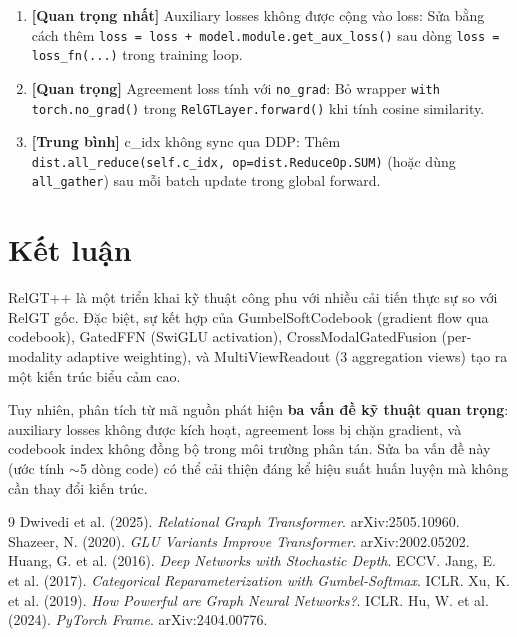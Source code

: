 \documentclass[12pt,a4paper]{article}
\begin{document}
\begin{enumerate}
  \item \textbf{[Quan trọng nhất]} Auxiliary losses không được cộng vào loss:
        Sửa bằng cách thêm \texttt{loss = loss + model.module.get\_aux\_loss()}
        sau dòng \texttt{loss = loss\_fn(...)} trong training loop.
  \item \textbf{[Quan trọng]} Agreement loss tính với \texttt{no\_grad}:
        Bỏ wrapper \texttt{with torch.no\_grad()} trong
        \texttt{RelGTLayer.forward()} khi tính cosine similarity.
  \item \textbf{[Trung bình]} c\_idx không sync qua DDP:
        Thêm \texttt{dist.all\_reduce(self.c\_idx, op=dist.ReduceOp.SUM)}
        (hoặc dùng \texttt{all\_gather}) sau mỗi batch update trong global forward.
\end{enumerate}

\section{Kết luận}

RelGT++ là một triển khai kỹ thuật công phu với nhiều cải tiến thực sự
so với RelGT gốc. Đặc biệt, sự kết hợp của GumbelSoftCodebook (gradient
flow qua codebook), GatedFFN (SwiGLU activation), CrossModalGatedFusion
(per-modality adaptive weighting), và MultiViewReadout (3 aggregation views)
tạo ra một kiến trúc biểu cảm cao.

Tuy nhiên, phân tích từ mã nguồn phát hiện \textbf{ba vấn đề kỹ thuật
quan trọng}: auxiliary losses không được kích hoạt, agreement loss bị
chặn gradient, và codebook index không đồng bộ trong môi trường phân tán.
Sửa ba vấn đề này (ước tính $\sim$5 dòng code) có thể cải thiện đáng kể
hiệu suất huấn luyện mà không cần thay đổi kiến trúc.

\begin{thebibliography}{9}
Dwivedi et al. (2025). \textit{Relational Graph Transformer}. arXiv:2505.10960.
Shazeer, N. (2020). \textit{GLU Variants Improve Transformer}. arXiv:2002.05202.
Huang, G. et al. (2016). \textit{Deep Networks with Stochastic Depth}. ECCV.
Jang, E. et al. (2017). \textit{Categorical Reparameterization with Gumbel-Softmax}. ICLR.
Xu, K. et al. (2019). \textit{How Powerful are Graph Neural Networks?}. ICLR.
Hu, W. et al. (2024). \textit{PyTorch Frame}. arXiv:2404.00776.
\end{thebibliography}
\end{document}
